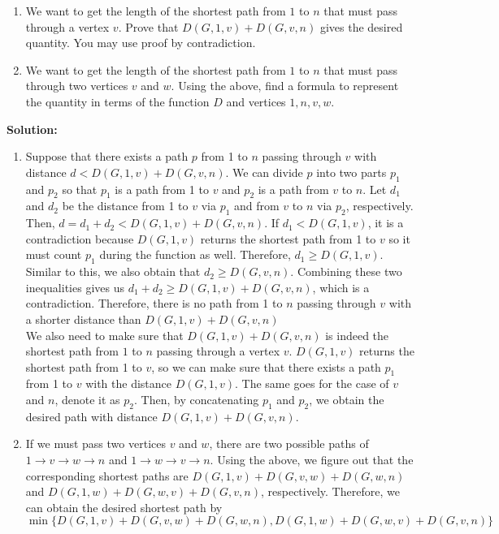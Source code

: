 \documentclass[11pt]{article}
\begin{document}
\begin{qunlist}
\begin{enumerate}
    \item We want to get the length of the shortest path from $1$ to $n$ that must pass through a vertex $v$. 
	Prove that $D(G, 1, v) + D(G, v, n)$ gives the desired quantity. You may use proof by contradiction.
    \item We want to get the length of the shortest path from $1$ to $n$ that must pass through two vertices $v$ and $w$. 
	Using the above, find a formula to represent the quantity in terms of the function $D$ and vertices $1, n, v, w$.
\end{enumerate}
\textbf{Solution: }
\begin{enumerate}
    \item 
    Suppose that there exists a path $p$ from 1 to $n$ passing through $v$ with distance $d < D(G, 1, v) + D(G, v, n)$. We can divide $p$ into two parts $p_1$ and $p_2$ so that $p_1$ is a path from 1 to $v$ and $p_2$ is a path from $v$ to $n$. Let $d_1$ and $d_2$ be the distance from 1 to $v$ via $p_1$ and from $v$ to $n$ via $p_2$, respectively. Then, $d = d_1 + d_2 <  D(G, 1, v) + D(G, v, n)$. If $d_1 < D(G, 1, v)$, it is a contradiction because $D(G, 1, v)$ returns the shortest path from 1 to $v$ so it must count $p_1$ during the function as well. Therefore, $d_1 \geq D(G,1,v)$. Similar to this, we also obtain that $d_2 \geq D(G,v,n)$. Combining these two inequalities gives us $d_1 + d_2 \geq D(G,1,v) + D(G, v, n)$, which is a contradiction. Therefore, there is no path from 1 to $n$ passing through $v$ with a shorter distance than $ D(G, 1, v) + D(G, v, n)$\\
    We also need to make sure that $D(G, 1, v) + D(G, v, n)$ is indeed the shortest path from $1$ to $n$ passing through a vertex $v$. $D(G, 1, v)$ returns the shortest path from 1 to $v$, so we can make sure that there exists a path $p_1$ from 1 to $v$ with the distance $D(G, 1, v)$. The same goes for the case of $v$ and $n$, denote it as $p_2$. Then, by concatenating $p_1$ and $p_2$, we obtain the desired path with distance $D(G, 1, v) + D(G, v, n)$.
    \item If we must pass two vertices $v$ and $w$, there are two possible paths of $1 \rightarrow v \rightarrow w \rightarrow n$ and $1 \rightarrow w \rightarrow v \rightarrow n$. Using the above, we figure out that the corresponding shortest paths are $D(G,1,v) + D(G, v, w) + D(G, w, n)$ and $D(G,1,w) + D(G, w, v) + D(G, v, n)$, respectively. Therefore, we can obtain the desired shortest path by $\min\{D(G,1,v) + D(G, v, w) + D(G, w, n), D(G,1,w) + D(G, w, v) + D(G, v, n)\}$
\end{enumerate}


\end{qunlist}
\end{document}
